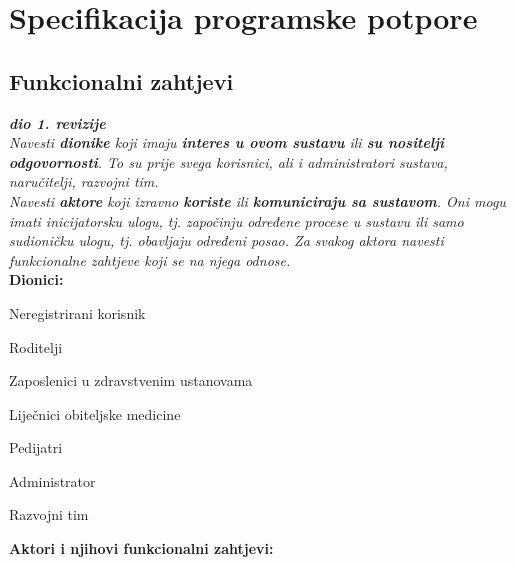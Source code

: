 \chapter{Specifikacija programske potpore}
		
	\section{Funkcionalni zahtjevi}
			
			\textbf{\textit{dio 1. revizije}}\\
			
			\textit{Navesti \textbf{dionike} koji imaju \textbf{interes u ovom sustavu} ili  \textbf{su nositelji odgovornosti}. To su prije svega korisnici, ali i administratori sustava, naručitelji, razvojni tim.}\\
				
			\textit{Navesti \textbf{aktore} koji izravno \textbf{koriste} ili \textbf{komuniciraju sa sustavom}. Oni mogu imati inicijatorsku ulogu, tj. započinju određene procese u sustavu ili samo sudioničku ulogu, tj. obavljaju određeni posao. Za svakog aktora navesti funkcionalne zahtjeve koji se na njega odnose.}\\
			
			
			\noindent \textbf{Dionici:}
			
			\begin{packed_enum}
				
				\item Neregistrirani korisnik
				\item Roditelji
				\item Zaposlenici u zdravstvenim ustanovama
					\begin{packed_enum}
						\item Liječnici obiteljske medicine
						\item Pedijatri
					\end{packed_enum}				
				\item Administrator
				\item Razvojni tim
				
			\end{packed_enum}
			
			\noindent \textbf{Aktori i njihovi funkcionalni zahtjevi:}
			
